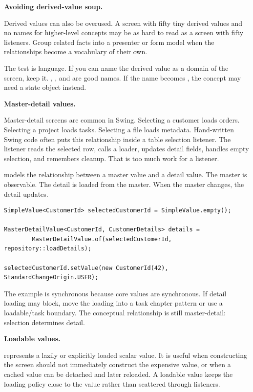 \textbf{Avoiding derived-value soup.}

Derived values can also be overused. A screen with fifty tiny derived values and
no names for higher-level concepts may be as hard to read as a screen with fifty
listeners. Group related facts into a presenter or form model when the
relationships become a vocabulary of their own.

The test is language. If you can name the derived value as a domain of the
screen, keep it. , , and
 are good names. If the name becomes
, the concept may need a state
object instead.

\textbf{Master-detail values.}

Master-detail screens are common in Swing. Selecting a customer loads orders.
Selecting a project loads tasks. Selecting a file loads metadata. Hand-written
Swing code often puts this relationship inside a table selection listener. The
listener reads the selected row, calls a loader, updates detail fields, handles
empty selection, and remembers cleanup. That is too much work for a listener.

 models the relationship between a master value and
a detail value. The master is observable. The detail is loaded from the master.
When the master changes, the detail updates.

\begin{lstlisting}[caption={Detail value follows the selected master.}]
SimpleValue<CustomerId> selectedCustomerId = SimpleValue.empty();

MasterDetailValue<CustomerId, CustomerDetails> details =
        MasterDetailValue.of(selectedCustomerId, repository::loadDetails);

selectedCustomerId.setValue(new CustomerId(42), StandardChangeOrigin.USER);
\end{lstlisting}

The example is synchronous because core values are synchronous. If detail
loading may block, move the loading into a task chapter pattern or use a
loadable/task boundary. The conceptual relationship is still master-detail:
selection determines detail.

\textbf{Loadable values.}

 represents a lazily or explicitly loaded scalar value.
It is useful when constructing the screen should not immediately construct the
expensive value, or when a cached value can be detached and later reloaded. A
loadable value keeps the loading policy close to the value rather than scattered
through listeners.

